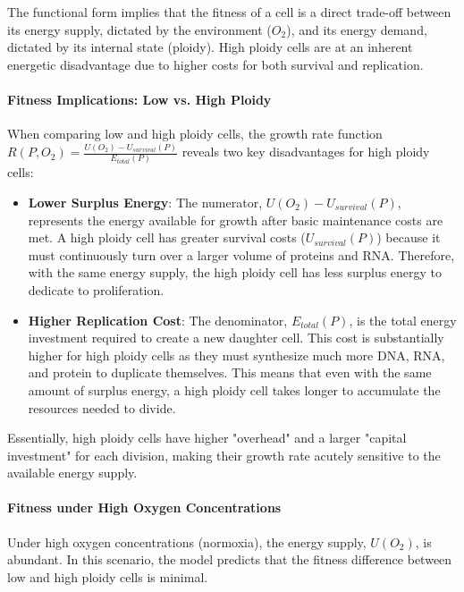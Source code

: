 \documentclass{article}
\begin{document}
The functional form implies that the fitness of a cell is a direct trade-off between its energy supply, dictated by the environment ($O_2$), and its energy demand, dictated by its internal state (ploidy). High ploidy cells are at an inherent energetic disadvantage due to higher costs for both survival and replication.

\paragraph{Fitness Implications: Low vs. High Ploidy}

When comparing low and high ploidy cells, the growth rate function $R(P, O_2) = \frac{U(O_2) - U_{survival}(P)}{E_{total}(P)}$ reveals two key disadvantages for high ploidy cells:

\begin{itemize}
    \item \textbf{Lower Surplus Energy}: The numerator, $U(O_2) - U_{survival}(P)$, represents the energy available for growth after basic maintenance costs are met. A high ploidy cell has greater survival costs ($U_{survival}(P)$) because it must continuously turn over a larger volume of proteins and RNA. Therefore, with the same energy supply, the high ploidy cell has less surplus energy to dedicate to proliferation.

    \item \textbf{Higher Replication Cost}: The denominator, $E_{total}(P)$, is the total energy investment required to create a new daughter cell. This cost is substantially higher for high ploidy cells as they must synthesize much more DNA, RNA, and protein to duplicate themselves. This means that even with the same amount of surplus energy, a high ploidy cell takes longer to accumulate the resources needed to divide.
\end{itemize}

Essentially, high ploidy cells have higher "overhead" and a larger "capital investment" for each division, making their growth rate acutely sensitive to the available energy supply.

\paragraph{Fitness under High Oxygen Concentrations}

Under high oxygen concentrations (normoxia), the energy supply, $U(O_2)$, is abundant. In this scenario, the model predicts that the fitness difference between low and high ploidy cells is minimal.
\end{document}

